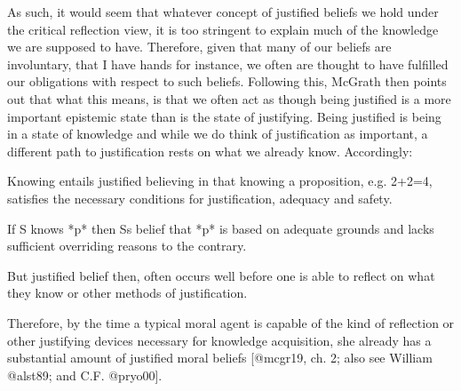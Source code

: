 \documentclass[
  12pt,
]{book}
\newenvironment{Shaded}{\begin{snugshade}}{\end{snugshade}}
\newcommand{\NormalTok}[1]{#1}
\theoremstyle{definition}
\theoremstyle{definition}
\theoremstyle{definition}
\theoremstyle{definition}
\theoremstyle{remark}
\begin{document}
As such, it would seem that whatever concept of justified beliefs we hold under the critical reflection view, it is too stringent to explain much of the knowledge we are supposed to have. Therefore, given that many of our beliefs are involuntary, that I have hands for instance, we often are thought to have fulfilled our obligations with respect to such beliefs. Following this, McGrath then points out that what this means, is that we often act as though being justified is a more important epistemic state than is the state of justifying. Being justified is being in a state of knowledge and while we do think of justification as important, a different path to justification rests on what we already know. Accordingly:

\begin{Shaded}
\begin{Highlighting}[]

\NormalTok{Knowing entails justified believing in that knowing a proposition, e.g. 2+2=4, satisfies the necessary conditions for justification, adequacy and safety.}
\end{Highlighting}
\end{Shaded}

\begin{Shaded}
\begin{Highlighting}[]

\NormalTok{If S knows *p* then S\textquotesingle{}s belief that *p* is based on adequate grounds and lacks sufficient overriding reasons to the contrary.}
\end{Highlighting}
\end{Shaded}

\begin{Shaded}
\begin{Highlighting}[]

\NormalTok{But justified belief then, often occurs well before one is able to reflect on what they know or other methods of justification.}
\end{Highlighting}
\end{Shaded}

\begin{Shaded}
\begin{Highlighting}[]

\NormalTok{Therefore, by the time a typical moral agent is capable of the kind of reflection or other justifying devices necessary for knowledge acquisition, she already has a substantial amount of justified moral beliefs [@mcgr19, ch. 2; also see William @alst89; and C.F. @pryo00].}
\end{Highlighting}
\end{Shaded}
\end{document}
